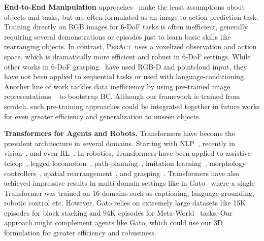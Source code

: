 \documentclass{article}
\newcommand{\model}{\textsc{PerAct}}
\begin{document}
\textbf{End-to-End Manipulation} approaches~\citep{kalashnikov2018qt,Wu-RSS-20,levine2016end,finn2017deep} make the least assumptions about objects and tasks, but are often formulated as an image-to-action prediction task. Training directly on RGB images for 6-DoF tasks is often inefficient, generally requiring several  demonstrations or episodes just to learn basic skills like rearranging objects. In contrast, \model~uses a voxelized observation and action space, which is dramatically more efficient and robust in 6-DoF settings.
While other works in 6-DoF grasping~\citep{song2020grasping,murali20206,mousavian20196,xu2022umpnet,agrawal2021scene,simeonov2021neural} have used RGB-D and pointcloud input, they have not been applied to sequential tasks or used with language-conditioning.
Another line of work tackles data inefficiency by using pre-trained image representations ~\citep{cliport,nair2022r3m,yuan2021sornet} to bootstrap BC. Although our framework is trained from scratch, such pre-training approaches could be integrated together in future works for even greater efficiency and generalization to unseen objects. 

\textbf{Transformers for Agents and Robots.} Transformers have become the prevalent architecture in several domains. Starting with NLP~\citep{vaswani2017attention,brown2020language,liu2019roberta}, recently in vision~\citep{dosovitskiy2020image,liu2021swin}, and even RL~\citep{chen2021decision,janner2021offline,lee2022multi}. In robotics, Transformers have been applied to assistive teleop~\citep{clever2021assistive},  legged locomotion~\citep{yang2021learning},  path-planning~\citep{chaplot2021differentiable,johnson2021motion}, imitation learning~\citep{dasari2020transformers,kim2021transformer}, morphology controllers~\citep{gupta2022metamorph}, spatial rearrangement~\citep{liu2022structformer}, and grasping~\citep{han2021learning}. Transformers have also achieved impressive results in multi-domain settings like in Gato~\cite{reed2022generalist} where a single Transformer was trained on 16 domains such as captioning, language-grounding, robotic control etc. However, Gato relies on extremely large datasets like 15K episodes for block stacking and 94K episodes for Meta-World~\citep{yu2020meta} tasks. Our approach might complement agents like Gato, which could use our 3D formulation for greater efficiency and robustness. 
\end{document}
